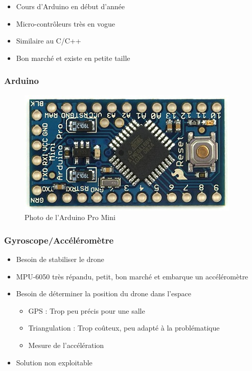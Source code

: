 \documentclass{beamer}
\begin{document}
{\begin{frame}
	  \begin{itemize}
	    \item Cours d'Arduino en début d'année
	    \item Micro-contrôleurs très en vogue
	    \item Similaire au C/C++
	    \item Bon marché et existe en petite taille
	  \end{itemize}
	\end{frame}
	
	\begin{frame}
	  \frametitle{Arduino}
	  
	  \begin{figure}[htbp]
	    \centering
	    \includegraphics[scale=0.2]{img/arduinopromini.jpg}
	    \caption{Photo de l'Arduino Pro Mini}
	  \end{figure} 
	\end{frame}
	
	\begin{frame} %
	  \frametitle{Gyroscope/Accéléromètre}
	
	  \begin{itemize}
	    \item Besoin de stabiliser le drone
	    \item MPU-6050 très répandu, petit, bon marché et embarque un 
accéléromètre
	    \item Besoin de déterminer la position du drone dans l'espace
	    \begin{itemize}
	      \item GPS : Trop peu précis pour une salle
	      \item Triangulation : Trop coûteux, peu adapté à la problématique
	      \item Mesure de l'accélération
	    \end{itemize}
	    \item Solution non exploitable
	  \end{itemize}
	\end{frame}
	
}
\end{document}
